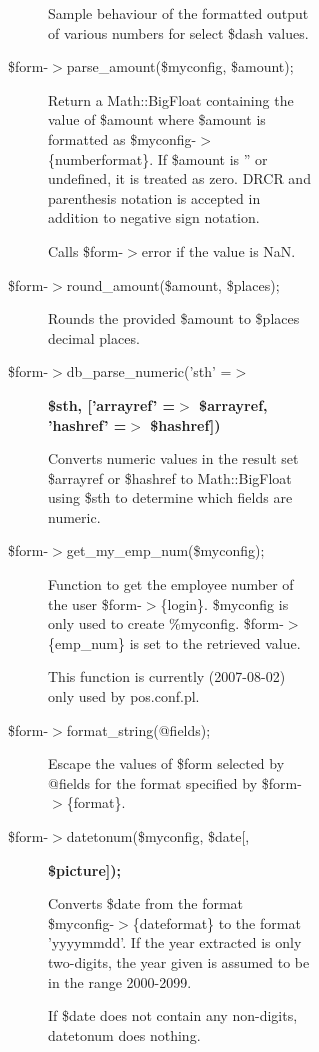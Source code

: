 \begin{description}
\begin{description}
\begin{description}
\begin{description}
\begin{description}
\begin{description}
Sample behaviour of the formatted output of various numbers for select \$dash
values.


\item[{\$form-$>$parse\_amount(\$myconfig, \$amount);}] \mbox{}

Return a Math::BigFloat containing the value of \$amount where \$amount is
formatted as \$myconfig-$>$\{numberformat\}.  If \$amount is '' or undefined, it is
treated as zero.  DRCR and parenthesis notation is accepted in addition to
negative sign notation.



Calls \$form-$>$error if the value is NaN.


\item[{\$form-$>$round\_amount(\$amount, \$places);}] \mbox{}

Rounds the provided \$amount to \$places decimal places.


\item[{\$form-$>$db\_parse\_numeric('sth' =$>$}] \textbf{\$sth, ['arrayref' =$>$ \$arrayref, 'hashref' =$>$ \$hashref])}

Converts numeric values in the result set \$arrayref or \$hashref to
Math::BigFloat using \$sth to determine which fields are numeric.


\item[{\$form-$>$get\_my\_emp\_num(\$myconfig);}] \mbox{}

Function to get the employee number of the user \$form-$>$\{login\}.  \$myconfig is
only used to create \%myconfig.  \$form-$>$\{emp\_num\} is set to the retrieved value.



This function is currently (2007-08-02) only used by pos.conf.pl.


\item[{\$form-$>$format\_string(@fields);}] \mbox{}

Escape the values of \$form selected by @fields for the format specified by
\$form-$>$\{format\}.


\item[{\$form-$>$datetonum(\$myconfig, \$date[,}] \textbf{\$picture]);}

Converts \$date from the format \$myconfig-$>$\{dateformat\} to the format 'yyyymmdd'.
If the year extracted is only two-digits, the year given is assumed to be in the
range 2000-2099.



If \$date does not contain any non-digits, datetonum does nothing.




\end{description}
\end{description}
\end{description}
\end{description}
\end{description}
\end{description}
